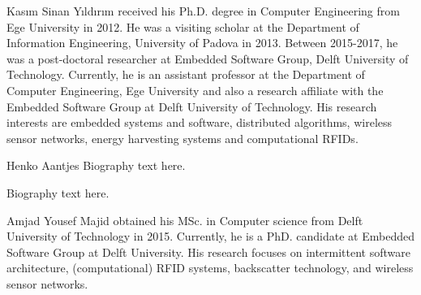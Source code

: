 \documentclass[10pt,journal,compsoc]{IEEEtran}
\begin{document}
\begin{IEEEbiography}{Kas{\i}m Sinan Y{\i}ld{\i}r{\i}m}
received his Ph.D. degree in Computer Engineering from Ege University 
in 2012. He was a visiting scholar at the Department of Information Engineering, University of Padova in 2013. Between 2015-2017, he was a post-doctoral researcher at Embedded Software Group, Delft University of Technology. Currently, he is an assistant professor at the Department of Computer Engineering, Ege University and also a research affiliate with the Embedded Software Group at Delft University of Technology. His research interests are embedded systems and software, distributed algorithms,  wireless sensor networks, energy harvesting systems and computational RFIDs.
\end{IEEEbiography}

\begin{IEEEbiographynophoto}{Henko Aantjes}
Biography text here.
\end{IEEEbiographynophoto}
%
\begin{IEEEbiography}{}
Biography text here.	
\end{IEEEbiography}
%
\begin{IEEEbiography}{Amjad Yousef Majid}
obtained his MSc. in Computer science from Delft University of Technology in 2015. Currently, he is a PhD. candidate at Embedded Software Group at Delft University. His research focuses on intermittent software architecture, (computational) RFID systems, backscatter technology, and wireless sensor networks.  
\end{IEEEbiography}
%
\end{document}
